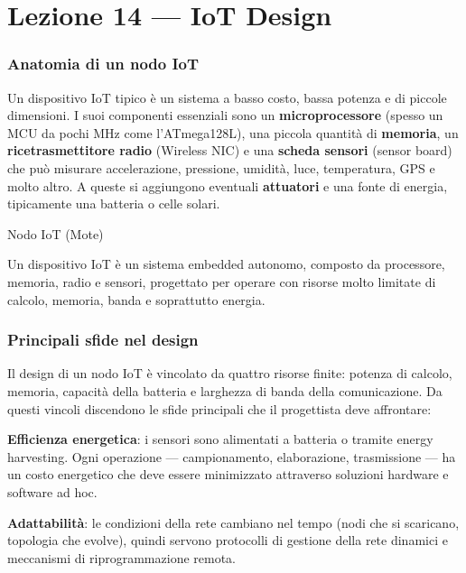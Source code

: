 \documentclass[
  italian,
  openany]{book}
\begin{document}
\newpage

\chapter{Lezione 14 --- IoT Design}\label{lezione-14-iot-design}

\subsection{Anatomia di un nodo IoT}\label{anatomia-di-un-nodo-iot}

Un dispositivo IoT tipico è un sistema a basso costo, bassa potenza e di
piccole dimensioni. I suoi componenti essenziali sono un
\textbf{microprocessore} (spesso un MCU da pochi MHz come l'ATmega128L),
una piccola quantità di \textbf{memoria}, un \textbf{ricetrasmettitore
radio} (Wireless NIC) e una \textbf{scheda sensori} (sensor board) che
può misurare accelerazione, pressione, umidità, luce, temperatura, GPS e
molto altro. A queste si aggiungono eventuali \textbf{attuatori} e una
fonte di energia, tipicamente una batteria o celle solari.

\begin{calloutdefinition}{Nodo IoT (Mote)}

Un dispositivo IoT è un sistema embedded autonomo, composto da
processore, memoria, radio e sensori, progettato per operare con risorse
molto limitate di calcolo, memoria, banda e soprattutto energia.

\end{calloutdefinition}

\subsection{Principali sfide nel
design}\label{principali-sfide-nel-design}

Il design di un nodo IoT è vincolato da quattro risorse finite: potenza
di calcolo, memoria, capacità della batteria e larghezza di banda della
comunicazione. Da questi vincoli discendono le sfide principali che il
progettista deve affrontare:

\textbf{Efficienza energetica}: i sensori sono alimentati a batteria o
tramite energy harvesting. Ogni operazione --- campionamento,
elaborazione, trasmissione --- ha un costo energetico che deve essere
minimizzato attraverso soluzioni hardware e software ad hoc.

\textbf{Adattabilità}: le condizioni della rete cambiano nel tempo (nodi
che si scaricano, topologia che evolve), quindi servono protocolli di
gestione della rete dinamici e meccanismi di riprogrammazione remota.
\end{document}
